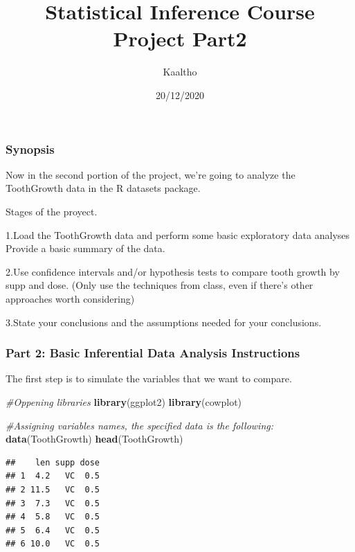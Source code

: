 \documentclass[
]{article}
\title{Statistical Inference Course Project Part2}
\author{Kaaltho}
\date{20/12/2020}
\newenvironment{Shaded}{\begin{snugshade}}{\end{snugshade}}
\newcommand{\CommentTok}[1]{\textcolor[rgb]{0.56,0.35,0.01}{\textit{#1}}}
\newcommand{\KeywordTok}[1]{\textcolor[rgb]{0.13,0.29,0.53}{\textbf{#1}}}
\newcommand{\NormalTok}[1]{#1}
\begin{document}
\maketitle

\hypertarget{synopsis}{%
\subsubsection{Synopsis}\label{synopsis}}

Now in the second portion of the project, we're going to analyze the
ToothGrowth data in the R datasets package.

Stages of the proyect.

1.Load the ToothGrowth data and perform some basic exploratory data
analyses Provide a basic summary of the data.

2.Use confidence intervals and/or hypothesis tests to compare tooth
growth by supp and dose. (Only use the techniques from class, even if
there's other approaches worth considering)

3.State your conclusions and the assumptions needed for your
conclusions.

\hypertarget{part-2-basic-inferential-data-analysis-instructions}{%
\subsubsection{\texorpdfstring{\textbf{Part 2: Basic Inferential Data
Analysis
Instructions}}{Part 2: Basic Inferential Data Analysis Instructions}}\label{part-2-basic-inferential-data-analysis-instructions}}

The first step is to simulate the variables that we want to compare.

\begin{Shaded}
\begin{Highlighting}[]
\CommentTok{#Oppening libraries}
\KeywordTok{library}\NormalTok{(ggplot2)}
\KeywordTok{library}\NormalTok{(cowplot)}

\CommentTok{#Assigning variables names, the specified data is the following:}
\KeywordTok{data}\NormalTok{(ToothGrowth)}
\KeywordTok{head}\NormalTok{(ToothGrowth)}
\end{Highlighting}
\end{Shaded}

\begin{verbatim}
##    len supp dose
## 1  4.2   VC  0.5
## 2 11.5   VC  0.5
## 3  7.3   VC  0.5
## 4  5.8   VC  0.5
## 5  6.4   VC  0.5
## 6 10.0   VC  0.5
\end{verbatim}
\end{document}
